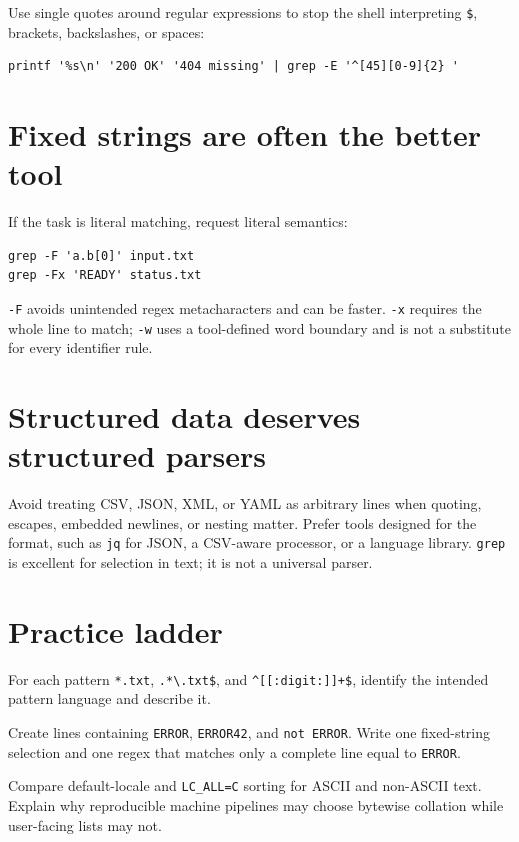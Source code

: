 \documentclass[11pt,oneside,openany]{book}
\begin{document}
Use single quotes around regular expressions to stop the shell interpreting \texttt{\$}, brackets, backslashes, or spaces:
\begin{lstlisting}
printf '%s\n' '200 OK' '404 missing' | grep -E '^[45][0-9]{2} '
\end{lstlisting}

\section{Fixed strings are often the better tool}
If the task is literal matching, request literal semantics:
\begin{lstlisting}
grep -F 'a.b[0]' input.txt
grep -Fx 'READY' status.txt
\end{lstlisting}
\texttt{-F} avoids unintended regex metacharacters and can be faster. \texttt{-x} requires the whole line to match; \texttt{-w} uses a tool-defined word boundary and is not a substitute for every identifier rule.

\section{Structured data deserves structured parsers}
Avoid treating CSV, JSON, XML, or YAML as arbitrary lines when quoting, escapes, embedded newlines, or nesting matter. Prefer tools designed for the format, such as \texttt{jq} for JSON, a CSV-aware processor, or a language library. \texttt{grep} is excellent for selection in text; it is not a universal parser.

\section{Practice ladder}
\begin{practicebox}[title={Easy -- glob or regex?}]
For each pattern \texttt{*.txt}, \texttt{.*\textbackslash.txt\$}, and \texttt{\textasciicircum{}[[:digit:]]+\$}, identify the intended pattern language and describe it.
\end{practicebox}
\begin{practicebox}[title={Medium -- anchors}]
Create lines containing \texttt{ERROR}, \texttt{ERROR42}, and \texttt{not ERROR}. Write one fixed-string selection and one regex that matches only a complete line equal to \texttt{ERROR}.
\end{practicebox}
\begin{practicebox}[title={Hard -- locale experiment}]
Compare default-locale and \texttt{LC\_ALL=C} sorting for ASCII and non-ASCII text. Explain why reproducible machine pipelines may choose bytewise collation while user-facing lists may not.
\end{practicebox}
\end{document}
